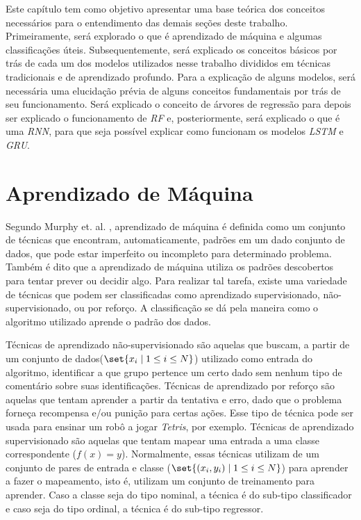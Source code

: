 Este capítulo tem como objetivo apresentar uma base teórica dos conceitos necessários para o entendimento das demais seções deste trabalho. Primeiramente, será explorado o que é aprendizado de máquina e algumas classificações úteis. Subsequentemente, será explicado os conceitos básicos por trás de cada um dos modelos utilizados nesse trabalho divididos em técnicas tradicionais e de aprendizado profundo. Para a explicação de alguns modelos, será necessária uma elucidação prévia de alguns conceitos fundamentais por trás de seu funcionamento. Será explicado o conceito de árvores de regressão para depois ser explicado o funcionamento de \textit{\acrshort{RF}} e, posteriormente, será explicado o que é uma \textit{\acrshort{RNN}}, para que seja possível explicar como funcionam os modelos \textit{\acrshort{LSTM}} e \textit{\acrshort{GRU}}.

\section{Aprendizado de Máquina}

Segundo Murphy et. al. \cite{murphy2012machine}, aprendizado de máquina é definida como um conjunto de técnicas que encontram, automaticamente, padrões em um dado conjunto de dados, que pode estar imperfeito ou incompleto para determinado problema. Também é dito que a aprendizado de máquina utiliza os padrões descobertos para tentar prever ou decidir algo. Para realizar tal tarefa, existe uma variedade de técnicas que podem ser classificadas como aprendizado supervisionado, não-supervisionado, ou por reforço. A classificação se dá pela maneira como o algoritmo utilizado aprende o padrão dos dados.

Técnicas de aprendizado não-supervisionado são aquelas que buscam, a partir de um conjunto de dados(\(\set{x_i \mid 1\leq i\leq N}\)) utilizado como entrada do algoritmo, identificar a que grupo pertence um certo dado sem nenhum tipo de comentário sobre suas identificações. Técnicas de aprendizado por reforço são aquelas que tentam aprender a partir da tentativa e erro, dado que o problema forneça recompensa e/ou punição para certas ações. Esse tipo de técnica pode ser usada para ensinar um robô a jogar \textit{Tetris}, por exemplo. Técnicas de aprendizado supervisionado são aquelas que tentam mapear uma entrada a uma classe correspondente (\(f(x) = y\)). Normalmente, essas técnicas utilizam de um conjunto de pares de entrada e classe (\(\set{(x_i, y_i) \mid 1\leq i\leq N}\)) para aprender a fazer o mapeamento, isto é, utilizam um conjunto de treinamento para aprender. Caso a classe seja do tipo nominal, a técnica é do sub-tipo classificador e caso seja do tipo ordinal, a técnica é do sub-tipo regressor.

